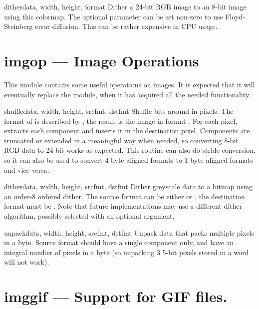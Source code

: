 \begin{methoddesc}[colormap]{dither}{data, width, height, format}
Dither a 24-bit RGB image to an 8-bit image using this colormap. The
optional  parameter can be set non-zero to use
Floyd-Steinberg error diffusion. This can be rather expensive in CPU
usage. 
\end{methoddesc}

\section{imgop ---
	Image Operations}

This module contains some useful operations on images. It is expected
that it will eventually replace the  module, when it has
acquired all the needed functionality.

\begin{funcdesc}{shuffle}{data, width, height, srcfmt, dstfmt}
Shuffle bits around in pixels. The format of  is described
by , the result is the image in format . For
each pixel,  extracts each component and inserts it in
the destination pixel. Components are truncated or extended in a
meaningful way when needed, so converting 8-bit RGB data to 24-bit
works as expected. This routine can also do stride-conversion, so it
can also be used to convert 4-byte aligned formats to 1-byte aligned
formats and vice versa.
\end{funcdesc}

\begin{funcdesc}{dither}{data, width, height, srcfmt, dstfmt}
Dither greyscale data to a bitmap using an order-8 ordered dither. The
source format can be either  or , the destination
format must be . Note that future implementations may
use a different dither algorithm, possibly selected with an optional
argument.
\end{funcdesc}

\begin{funcdesc}{unpack}{data, width, height, srcfmt, dstfmt}
Unpack data that packs multiple pixels in a byte. Source format should
have a single component only, and have an integral number of pixels in
a byte (so unpacking 3 5-bit pixels stored in a word will not work).
\end{funcdesc}

\section{imggif ---
	Support for GIF files.}

